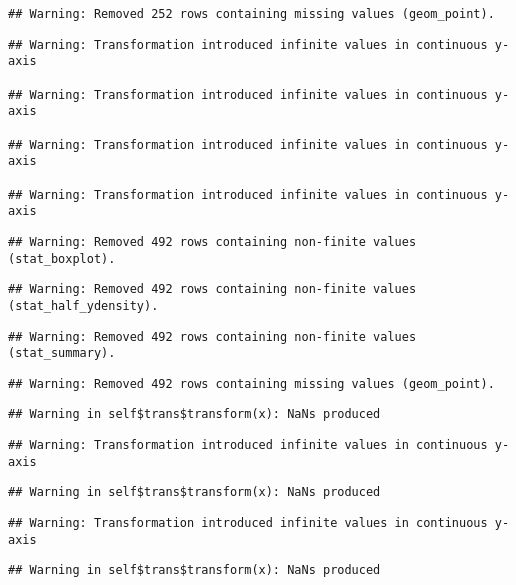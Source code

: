 \documentclass[a4paper,nobind]{templates/ociamthesis}
\begin{document}
\begin{landscape}
\begin{verbatim}
## Warning: Removed 252 rows containing missing values (geom_point).
\end{verbatim}

\begin{verbatim}
## Warning: Transformation introduced infinite values in continuous y-axis

## Warning: Transformation introduced infinite values in continuous y-axis

## Warning: Transformation introduced infinite values in continuous y-axis

## Warning: Transformation introduced infinite values in continuous y-axis
\end{verbatim}

\begin{verbatim}
## Warning: Removed 492 rows containing non-finite values (stat_boxplot).
\end{verbatim}

\begin{verbatim}
## Warning: Removed 492 rows containing non-finite values (stat_half_ydensity).
\end{verbatim}

\begin{verbatim}
## Warning: Removed 492 rows containing non-finite values (stat_summary).
\end{verbatim}

\begin{verbatim}
## Warning: Removed 492 rows containing missing values (geom_point).
\end{verbatim}

\begin{verbatim}
## Warning in self$trans$transform(x): NaNs produced
\end{verbatim}

\begin{verbatim}
## Warning: Transformation introduced infinite values in continuous y-axis
\end{verbatim}

\begin{verbatim}
## Warning in self$trans$transform(x): NaNs produced
\end{verbatim}

\begin{verbatim}
## Warning: Transformation introduced infinite values in continuous y-axis
\end{verbatim}

\begin{verbatim}
## Warning in self$trans$transform(x): NaNs produced
\end{verbatim}


\end{landscape}
\end{document}
